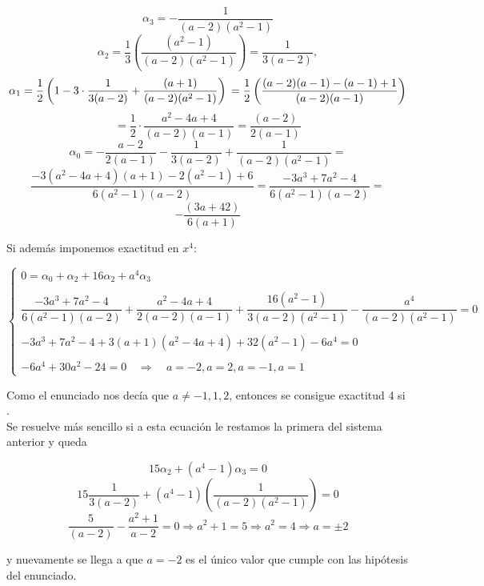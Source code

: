 \documentclass[12pt]{article}
\begin{document}
\begin{ejercicio}[4 puntos]
\begin{enumerate}
        $$
        \alpha_3 = -\frac{1}{(a-2)(a^2-1)}
        $$$$
        \alpha_2 = \frac{1}{3} \left(\frac{(a^2-1)}{(a-2)(a^2-1)} \right) = \frac{1}{3(a-2)}, 
        $$$$
        \alpha_1 = \frac{1}{2} \left( 1 - 3 \cdot \frac{1}{3(a - 2)} + \frac{(a + 1)}{(a - 2)(a^2 - 1)} \right) \\
            = \frac{1}{2} \left( \frac{(a - 2)(a - 1) - (a - 1) + 1}{(a - 2)(a - 1)} \right)
        $$$$
            = \frac{1}{2} \cdot \frac{a^2-4a+4}{(a - 2)(a - 1)} = \frac{(a - 2)}{2(a - 1)}
        $$$$
        \alpha_0 = - \frac{a - 2}{2(a - 1)} - \frac{1}{3(a - 2)} + \frac{1}{(a - 2)(a^2 - 1)} = 
        $$$$
        \frac{-3(a^2 - 4a + 4)(a + 1) - 2(a^2 - 1) + 6}{6 (a^2 - 1)(a - 2)} = \frac{-3a^3 + 7a^2 - 4}{6 (a^2 - 1)(a - 2)} =
        $$$$
         - \frac{(3a + 42)}{6 (a + 1)}
        $$

        Si además imponemos exactitud en $x^4$:

        $$\begin{cases}
        0 = \alpha_0 + \alpha_2 + 16\alpha_2 + a^4\alpha_3 \\\\
        \dfrac{-3a^3 + 7a^2 - 4}{6 (a^2 - 1)(a - 2)} + \dfrac{a^2 - 4a + 4}{2 (a - 2)(a - 1)} + \dfrac{16 (a^2 - 1)}{3 (a - 2)(a^2 - 1)} - \dfrac{a^4}{(a - 2)(a^2 - 1)} = 0 \\\\
        -3a^3 + 7a^2 - 4 + 3 (a + 1)(a^2 - 4a + 4) + 32 (a^2 - 1) - 6a^4 = 0 \\\\
        
        -6a^4 + 30a^2 - 24 = 0 \quad \Longrightarrow \quad a = -2, a = 2, a = -1, a = 1

        \end{cases}$$

        Como el enunciado nos decía que $a \neq -1, 1, 2$, entonces se consigue exactitud 4 si . \\

        Se resuelve más sencillo si a esta ecuación le restamos la primera del sistema anterior y queda

        $$15\alpha_2 + (a^4-1)\alpha_3 = 0$$
        $$15 \dfrac{1}{3(a-2)} + (a^4-1) \left(\dfrac{1}{(a-2)(a^2-1)}\right) = 0$$
        $$\dfrac{5}{(a-2)} - \dfrac{a^2+1}{a-2} = 0 \Longrightarrow a^2 + 1 = 5 \Longrightarrow a^2 = 4 \Longrightarrow a = \pm 2$$

        y nuevamente se llega a que $a=-2$ es el único valor que cumple con las hipótesis del enunciado. \\


\end{enumerate}
\end{ejercicio}
\end{document}
